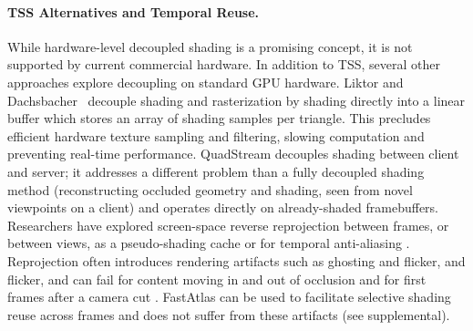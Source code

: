 \paragraph*{TSS Alternatives and Temporal Reuse.}
While hardware-level decoupled shading \cite{ragan2011decoupled, burns2010lazy,clarberg2013sort} is a promising concept, it is not supported by current commercial hardware. 
In addition to TSS, several other approaches explore decoupling on standard GPU hardware.
Liktor and Dachsbacher~ decouple shading and rasterization by shading directly into a linear buffer which stores an array of shading samples per triangle. This precludes efficient hardware texture sampling and filtering, slowing computation and preventing real-time performance. QuadStream \cite{hladky2022quadstream} decouples shading between client and server; it addresses a different problem than a fully decoupled shading method (reconstructing occluded geometry and shading, seen from novel viewpoints on a client) and operates directly on already-shaded framebuffers.
Researchers have explored screen-space reverse reprojection between frames, or between views, as a pseudo-shading cache \cite{nehab2007accelerating} or for temporal anti-aliasing \cite{karis2014hqaa, Yang2020TAA}.  Reprojection often introduces rendering artifacts such as ghosting and flicker, and flicker, and can fail for content moving in and out of occlusion and for first frames after a camera cut \cite{Scherzer11asurvey}. FastAtlas can be used to facilitate selective shading reuse across frames and does not suffer from these artifacts (see supplemental).